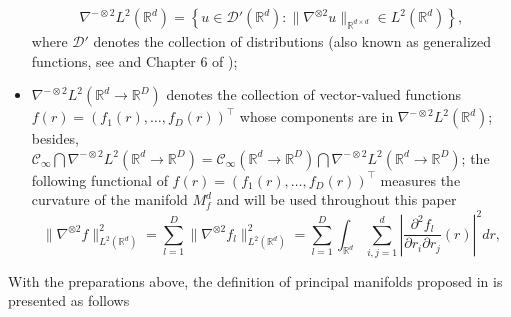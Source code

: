 \documentclass[11pt,reqno]{article}
\newcommand{\T}{\intercal}
\theoremstyle{definition}
\begin{document}
\begin{itemize}
    \begin{align*}
        \nabla^{-\otimes 2}L^2(\mathbb{R}^{d}) = \left\{u \in \mathcal{D}'(\mathbb{R}^{d}): \|\nabla^{\otimes 2} u\|_{\mathbb{R}^{d \times d}} \in L^2(\mathbb{R}^{d})\right\},
    \end{align*}
    where $\mathcal{D}'$ denotes the collection of distributions (also known as generalized functions, see \cite{duchon1977splines} and Chapter 6 of \cite{rudin1991functional});
    \item $\nabla^{-\otimes 2}L^2(\mathbb{R}^{d}\rightarrow\mathbb{R}^D)$ denotes the collection of vector-valued functions $f(r)=\left(f_1(r),\ldots,f_D(r)\right)^\T$ whose components are in $\nabla^{-\otimes 2}L^2(\mathbb{R}^{d})$; besides, $\mathcal{C}_\infty\bigcap\nabla^{-\otimes 2}L^2(\mathbb{R}^{d}\rightarrow\mathbb{R}^D)=\mathcal{C}_\infty(\mathbb{R}^{d}\rightarrow\mathbb{R}^D)\bigcap\nabla^{-\otimes 2}L^2(\mathbb{R}^{d}\rightarrow\mathbb{R}^D)$; the following functional of $f(r)=\left(f_1(r),\ldots,f_D(r)\right)^\T$ measures the curvature of the manifold $M_f^d$ and will be used throughout this paper
    \begin{equation}
  \|\nabla^{\otimes 2}f\|_{L^2(\mathbb{R}^{d})}^2 = \sum_{l=1}^{D} \|\nabla^{\otimes 2}f_l\|_{L^2(\mathbb{R}^{d})}^2  = \sum_{l=1}^{D} \int_{\mathbb{R}^{d}}\sum_{i, j = 1}^{d}\left|\frac{\partial^2f_l}{\partial r_i \partial r_j}(r)\right|^2dr, \label{eq:4}
\end{equation}
\end{itemize}
With the preparations above, the definition of principal manifolds proposed in \cite{mengPrincipalManifoldEstimation2021} is presented as follows
\end{document}
